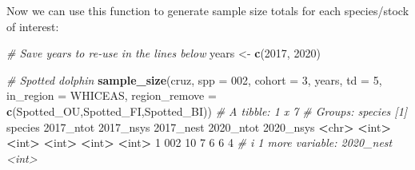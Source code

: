 \documentclass[
]{book}
\newenvironment{Shaded}{\begin{snugshade}}{\end{snugshade}}
\newcommand{\AttributeTok}[1]{\textcolor[rgb]{0.13,0.29,0.53}{#1}}
\newcommand{\CommentTok}[1]{\textcolor[rgb]{0.56,0.35,0.01}{\textit{#1}}}
\newcommand{\DecValTok}[1]{\textcolor[rgb]{0.00,0.00,0.81}{#1}}
\newcommand{\ErrorTok}[1]{\textcolor[rgb]{0.64,0.00,0.00}{\textbf{#1}}}
\newcommand{\FunctionTok}[1]{\textcolor[rgb]{0.13,0.29,0.53}{\textbf{#1}}}
\newcommand{\NormalTok}[1]{#1}
\newcommand{\OtherTok}[1]{\textcolor[rgb]{0.56,0.35,0.01}{#1}}
\newcommand{\SpecialCharTok}[1]{\textcolor[rgb]{0.81,0.36,0.00}{\textbf{#1}}}
\newcommand{\StringTok}[1]{\textcolor[rgb]{0.31,0.60,0.02}{#1}}
\begin{document}
Now we can use this function to generate sample size totals for each species/stock of interest:

\begin{Shaded}
\begin{Highlighting}[]
\CommentTok{\# Save years to re{-}use in the lines below}
\NormalTok{years }\OtherTok{\textless{}{-}} \FunctionTok{c}\NormalTok{(}\DecValTok{2017}\NormalTok{, }\DecValTok{2020}\NormalTok{)}

\CommentTok{\# Spotted dolphin}
\FunctionTok{sample\_size}\NormalTok{(cruz, }
            \AttributeTok{spp =} \StringTok{\textquotesingle{}002\textquotesingle{}}\NormalTok{, }
            \AttributeTok{cohort =} \DecValTok{3}\NormalTok{, }
\NormalTok{            years, }
            \AttributeTok{td =} \DecValTok{5}\NormalTok{, }
            \AttributeTok{in\_region =} \StringTok{\textquotesingle{}WHICEAS\textquotesingle{}}\NormalTok{,}
            \AttributeTok{region\_remove =} \FunctionTok{c}\NormalTok{(}\StringTok{\textquotesingle{}Spotted\_OU\textquotesingle{}}\NormalTok{,}\StringTok{\textquotesingle{}Spotted\_FI\textquotesingle{}}\NormalTok{,}\StringTok{\textquotesingle{}Spotted\_BI\textquotesingle{}}\NormalTok{))}
\CommentTok{\# A tibble: 1 x 7}
\CommentTok{\# Groups:   species [1]}
\NormalTok{  species }\StringTok{\textasciigrave{}}\AttributeTok{2017\_ntot}\StringTok{\textasciigrave{}} \StringTok{\textasciigrave{}}\AttributeTok{2017\_nsys}\StringTok{\textasciigrave{}} \StringTok{\textasciigrave{}}\AttributeTok{2017\_nest}\StringTok{\textasciigrave{}} \StringTok{\textasciigrave{}}\AttributeTok{2020\_ntot}\StringTok{\textasciigrave{}} \StringTok{\textasciigrave{}}\AttributeTok{2020\_nsys}\StringTok{\textasciigrave{}}
  \SpecialCharTok{\textless{}}\NormalTok{chr}\SpecialCharTok{\textgreater{}}         \ErrorTok{\textless{}}\NormalTok{int}\SpecialCharTok{\textgreater{}}       \ErrorTok{\textless{}}\NormalTok{int}\SpecialCharTok{\textgreater{}}       \ErrorTok{\textless{}}\NormalTok{int}\SpecialCharTok{\textgreater{}}       \ErrorTok{\textless{}}\NormalTok{int}\SpecialCharTok{\textgreater{}}       \ErrorTok{\textless{}}\NormalTok{int}\SpecialCharTok{\textgreater{}}
\DecValTok{1} \DecValTok{002}              \DecValTok{10}           \DecValTok{7}           \DecValTok{6}           \DecValTok{6}           \DecValTok{4}
\CommentTok{\# i 1 more variable: \textasciigrave{}2020\_nest\textasciigrave{} \textless{}int\textgreater{}}


\end{Highlighting}
\end{Shaded}
\end{document}
